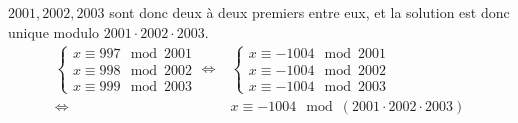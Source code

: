 {\begin{enumerate}
{      $2001,2002,2003$ sont donc deux à deux premiers entre eux, et la
      solution est donc unique modulo $2001\cdot2002\cdot2003$.
    \begin{align*}
      \begin{cases}        
        x \equiv 997 \mod 2001\\
        x \equiv 998 \mod 2002\\
        x \equiv 999 \mod 2003
      \end{cases}
      \Leftrightarrow&
      \begin{cases}        
        x \equiv -1004 \mod 2001\\
        x \equiv -1004 \mod 2002\\
        x \equiv -1004 \mod 2003
      \end{cases}\\
      \Leftrightarrow&
        x \equiv -1004 \mod (2001\cdot2002\cdot2003)
    \end{align*}}
\end{enumerate}
}
